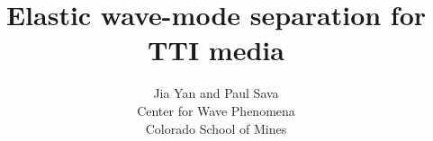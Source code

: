 
\title{Elastic wave-mode separation for TTI media}
\author{Jia Yan and Paul Sava \\ 
Center for Wave Phenomena \\ 
Colorado School of Mines}


\maketitle







     
 
        
     
   
  





